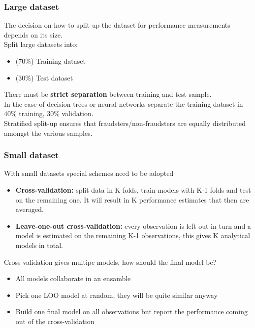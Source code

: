         \subsubsection{Large dataset}
            The decision on how to split up the dataset for performance measurements depends on its size.\\
            Split large datasets into:
            \begin{itemize}
                \item (70\%) Training dataset 
                \item (30\%) Test dataset
            \end{itemize}
            There must be \textbf{strict separation} between training and test sample.\\
            In the case of decision trees or neural networks separate the training dataset in 40\% training, 30\% validation.\\
            Stratified split-up ensures that fraudsters/non-fraudsters are equally distributed amongst the various samples.
        \subsubsection{Small dataset}
            With small datasets special schemes need to be adopted
            \begin{itemize}
                \item \textbf{Cross-validation:} split data in K folds, train models with K-1 folds and test on the remaining one. It will result in K performance estimates that then are averaged.
                \item \textbf{Leave-one-out cross-validation:} every observation is left out in turn and a model is estimated on the remaining K-1 observations, this gives K analytical models in total.
            \end{itemize}
            Cross-validation gives multipe models, how should the final model be?
            \begin{itemize}
                \item All models collaborate in an ensamble 
                \item Pick one LOO model at random, they will be quite similar anyway
                \item Build one final model on all observations but report the performance coming out of the cross-validation
            \end{itemize}
